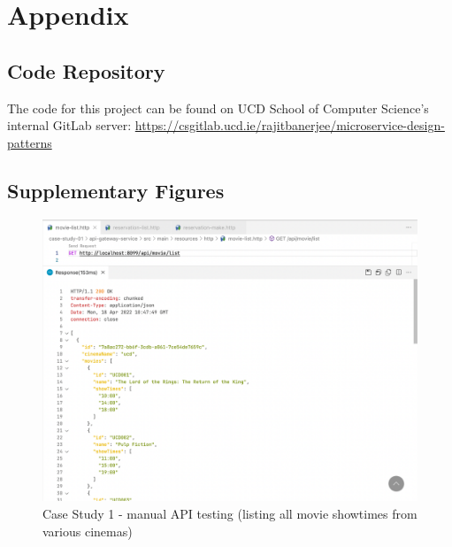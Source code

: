 \chapter{Appendix}


\section{Code Repository}

The code for this project can be found on UCD School of Computer Science's internal GitLab server: \url{https://csgitlab.ucd.ie/rajitbanerjee/microservice-design-patterns}

\section{Supplementary Figures}


\begin{figure}[H]
	\centering
	\includegraphics[width=1.0\linewidth]{./assets/images/case-studies/cs01-manual-1.png}
	\caption{Case Study 1 - manual API testing (listing all movie showtimes from various cinemas)}
	\label{fig:cs01-manual-1}
\end{figure}

